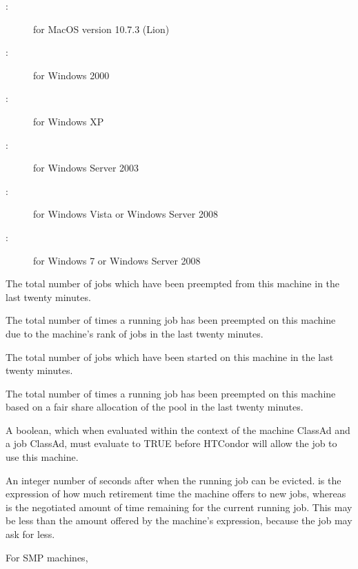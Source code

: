\begin{description}
\begin{description}
	\item[:] for MacOS version 10.7.3 (Lion)
	\item[:] for Windows 2000
	\item[:] for Windows XP
	\item[:] for Windows Server 2003
	\item[:] for Windows Vista or Windows Server 2008
	\item[:] for Windows 7 or Windows Server 2008
	\end{description}
%
\item[\AdAttr{RecentJobPreemptions}:] The total number of jobs which
have been preempted from this machine in the last twenty minutes.
%
\item[\AdAttr{RecentJobRankPreemptions}:] The total number of times
a running job has been preempted on this machine due to the machine's
rank of jobs in the last twenty minutes.  
%
\item[\AdAttr{RecentJobStarts}:] The total number of jobs which
have been started on this machine in the last twenty minutes.
%
\item[\AdAttr{RecentJobUserPrio}:] The total number of times
a running job has been preempted on this machine based on a fair share
allocation of the pool 
in the last twenty minutes.
%
\item[\AdAttr{Requirements}:] A boolean, which when evaluated within the context
of the machine ClassAd and a job ClassAd, must evaluate to
TRUE before HTCondor will allow the job to use this machine.
%
\item[\AdAttr{RetirementTimeRemaining}:] An integer number of seconds
after  when the running job can be evicted.
 is the expression of how much retirement
time the machine offers to new jobs, whereas 
is the negotiated amount of time remaining for the current running
job.  This may be less than the amount offered by the machine's
 expression, because the job may
ask for less.
%
\label{PartitionableSlot-machine-attribute} 
\item[\AdAttr{PartitionableSlot}:] For SMP machines,

\end{description}
